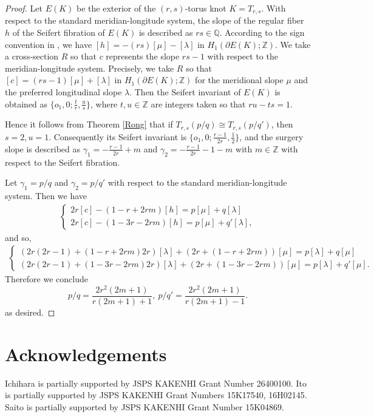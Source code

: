 \documentclass{amsart}
\theoremstyle{remark}
\theoremstyle{definition}
\begin{document}
\begin{proof}
Let $E(K)$ be the exterior of the $(r,s)$-torus knot $K=T_{r,s}$.
With respect to the standard meridian-longitude system, the slope of the regular fiber $h$ of the Seifert fibration of $E(K)$ is described as $rs \in \mathbb{Q}$. 
According to the sign convention in \cite{Rong}, we have $[h]=-(rs)[\mu] - [\lambda]$ in $H_{1}(\partial E(K); \mathbb{Z})$. 
We take a cross-section $R$ so that $c$ represents the slope $rs-1$ with respect to the meridian-longitude system. 
Precisely, we take $R$ so that $[c]=(rs-1)[\mu] +[\lambda]$ in $H_{1}(\partial E(K); \mathbb{Z})$ for the meridional slope $\mu$ and the preferred longitudinal slope $\lambda$. 
Then the Seifert invariant of $E(K)$ is obtained as 
$\{ o_1,0; \frac{t}{r},\frac{u}{s}\}$, where $t,u\in \mathbb{Z}$ are integers taken so that $ru-ts=1$. 

Hence it follows from Theorem \ref{Rong} that if $T_{r,s}(p/q)\cong T_{r,s}(p/q')$, then $s=2, u=1$. 
Consequently 
its Seifert invariant is $\{ o_1,0; \frac{r-1}{2r},\frac{1}{2}\}$, and the surgery slope is described as $\gamma_1=-\frac{r-1}{2r}+m$ and $\gamma_2=-\frac{r-1}{2r}-1-m$ with $m \in \mathbb{Z}$ with respect to the Seifert fibration. 

Let $\gamma_1 = p/q$ and $\gamma_2=p/q'$ with respect to the standard meridian-longitude system. 
Then we have
\begin{align*}
\begin{cases}
2r[c]-(1-r+2rm)[h]=p[\mu]+q[\lambda]\\
2r[c]-(1-3r-2rm)[h]=p[\mu]+q'[\lambda] , 
\end{cases} 
\end{align*}
and so, 
\begin{align*}
\begin{cases}
(2r(2r-1)+(1-r+2rm)2r)[\lambda]+ (2r+(1-r+2rm))[\mu] =p[\lambda]+q[\mu]\\
(2r(2r-1)+(1-3r-2rm)2r)[\lambda] +(2r+(1-3r-2rm))[\mu]=p[\lambda]+q'[\mu]. 
\end{cases} 
\end{align*}
Therefore we conclude
\[ p/q=\frac{2r^2(2m+1)}{r(2m+1)+1}, \ 
p/q'=\frac{2r^2(2m+1)}{r(2m+1)-1}.  \]
as desired.
\end{proof}




\section*{Acknowledgements}
Ichihara is partially supported by JSPS KAKENHI Grant Number 26400100. 
Ito is partially supported by JSPS KAKENHI Grant Numbers 15K17540, 16H02145. 
Saito is partially supported by JSPS KAKENHI Grant Number 15K04869. 
\end{document}
